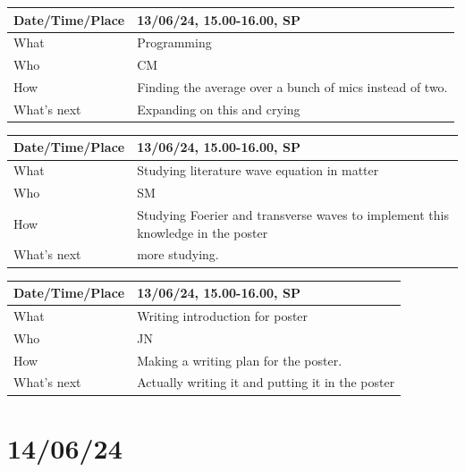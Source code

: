 \documentclass{article}
\begin{document}
\begin{table}[H]
\begin{tabular}{|p{1.5in}|p{4in}|}
\hline
Date/Time/Place & 13/06/24, 15.00-16.00, SP \\ \hline
What            &  Programming\\ \hline
Who             &  CM\\ \hline
How             & Finding the average over a bunch of mics instead of two. \\ \hline
What's next     &  Expanding on this and crying \\ \hline
\end{tabular}
\end{table}

\begin{table}[H]
\begin{tabular}{|p{1.5in}|p{4in}|}
\hline
Date/Time/Place & 13/06/24, 15.00-16.00, SP \\ \hline
What            & Studying literature wave equation in matter \\ \hline
Who             & SM \\ \hline
How             & Studying Foerier and transverse waves to implement this knowledge in the poster \\ \hline
What's next     & more studying. \\ \hline
\end{tabular}
\end{table}

\begin{table}[H]
\begin{tabular}{|p{1.5in}|p{4in}|}
\hline
Date/Time/Place & 13/06/24, 15.00-16.00, SP \\ \hline
What            & Writing introduction for poster \\ \hline
Who             & JN \\ \hline
How             & Making a writing plan for the poster. \\ \hline
What's next     & Actually writing it and putting it in the poster \\ \hline
\end{tabular}
\end{table}


\section{14/06/24}
\end{document}
